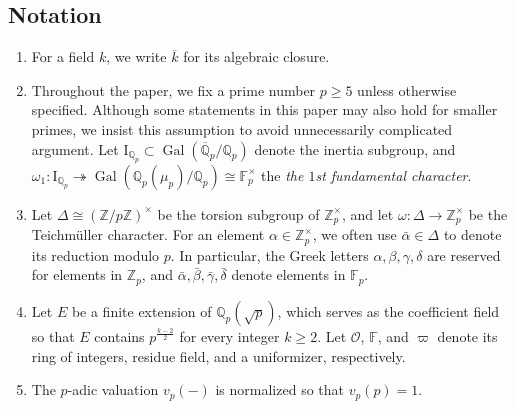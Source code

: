 \documentclass[12pt]{amsart}
\theoremstyle{definition}
\numberwithin{equation}{subsection}
\def\calO{\mathcal{O}}
\def\CC{\mathbb{C}}
\def\FF{\mathbb{F}}
\def\NN{\mathbb{N}}
\def\QQ{\mathbb{Q}}
\def\ZZ{\mathbb{Z}}
\def\rmI{\mathrm{I}}
\DeclareMathOperator{\Gal}{Gal}
\begin{document}
\subsection*{Notation}
\label{S:notation}
\begin{enumerate}
\item For a field $k$, we write $\overline k$ for its algebraic closure.


\item Throughout the paper, we fix a prime number $p\geq 5$ unless otherwise specified. Although some statements in this paper may also hold for smaller primes, we insist this assumption to avoid unnecessarily complicated argument.  %
Let $\rmI_{\QQ_p}\subset \Gal(\overline{\QQ}_p/\QQ_p)$ denote the inertia subgroup, and  $\omega_1: \rmI_{\QQ_p} \twoheadrightarrow\Gal(\QQ_p(\mu_p)/\QQ_p) \cong \FF_p^\times$ the \emph{the $1$st fundamental character}.


\item Let $\Delta \cong (\ZZ/p\ZZ)^\times$ be the torsion subgroup of
$\ZZ_p^\times$, and let $\omega:\Delta\rightarrow \ZZ_p^\times$ be the
Teichm\"{u}ller character.
For an element $\alpha \in \ZZ_p^\times$, we often use $\bar \alpha \in \Delta $ to denote its reduction modulo $p$.
In particular, the Greek letters $\alpha, \beta, \gamma, \delta$ are reserved for elements in $\ZZ_p$, and $\bar \alpha, \bar \beta, \bar \gamma, \bar \delta$ denote elements in $\FF_p$.


\item Let $E$ be a finite extension of $\QQ_p(\sqrt p)$, which serves as the coefficient field so that $E$ contains $p^{\frac{k-2}{2}}$ for every integer $k\geq 2$. Let $\calO$, $\FF$, and $\varpi$ denote its ring of integers, residue field, and a uniformizer, respectively.

\item The $p$-adic valuation $v_p(-)$ is normalized so that $v_p(p) =1$.


\end{enumerate}
\end{document}
